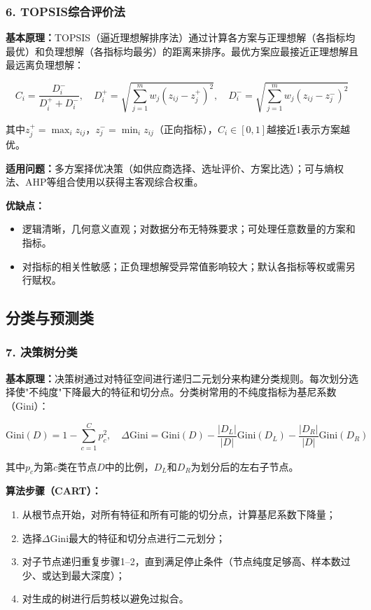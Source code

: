 \documentclass[12pt,a4paper]{ctexart}
\begin{document}
\subsubsection{6. TOPSIS综合评价法}

\textbf{基本原理：}TOPSIS（逼近理想解排序法）通过计算各方案与正理想解（各指标均最优）和负理想解（各指标均最劣）的距离来排序。最优方案应最接近正理想解且最远离负理想解：

\begin{equation}
C_i = \frac{D_i^-}{D_i^+ + D_i^-}, \quad
D_i^+ = \sqrt{\sum_{j=1}^m w_j (z_{ij} - z_j^+)^2}, \quad
D_i^- = \sqrt{\sum_{j=1}^m w_j (z_{ij} - z_j^-)^2}
\end{equation}

其中$z_j^+ = \max_i z_{ij}$，$z_j^- = \min_i z_{ij}$（正向指标），$C_i \in [0,1]$越接近1表示方案越优。

\textbf{适用问题：}多方案择优决策（如供应商选择、选址评价、方案比选）；可与熵权法、AHP等组合使用以获得主客观综合权重。

\textbf{优缺点：}
\begin{itemize}[leftmargin=*]
    \item[+] 逻辑清晰，几何意义直观；对数据分布无特殊要求；可处理任意数量的方案和指标。
    \item[$-$] 对指标的相关性敏感；正负理想解受异常值影响较大；默认各指标等权或需另行赋权。
\end{itemize}

\subsection{分类与预测类}

\subsubsection{7. 决策树分类}

\textbf{基本原理：}决策树通过对特征空间进行递归二元划分来构建分类规则。每次划分选择使"不纯度"下降最大的特征和切分点。分类树常用的不纯度指标为基尼系数（Gini）：

\begin{equation}
\text{Gini}(D) = 1 - \sum_{c=1}^{C} p_c^2, \quad
\Delta\text{Gini} = \text{Gini}(D) - \frac{|D_L|}{|D|}\text{Gini}(D_L) - \frac{|D_R|}{|D|}\text{Gini}(D_R)
\end{equation}

其中$p_c$为第$c$类在节点$D$中的比例，$D_L$和$D_R$为划分后的左右子节点。

\textbf{算法步骤（CART）：}
\begin{enumerate}[label=(\arabic*), leftmargin=*]
    \item 从根节点开始，对所有特征和所有可能的切分点，计算基尼系数下降量；
    \item 选择$\Delta$Gini最大的特征和切分点进行二元划分；
    \item 对子节点递归重复步骤1--2，直到满足停止条件（节点纯度足够高、样本数过少、或达到最大深度）；
    \item 对生成的树进行后剪枝以避免过拟合。
\end{enumerate}
\end{document}
